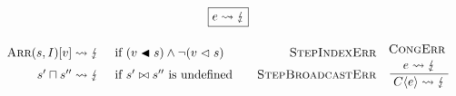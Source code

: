 \renewcommand\arraystretch{1.5}
\begin{gather*}
\boxed{e \sterr} \\[0.5em]
\begin{array}{rlr}
\sarrayval{\vess}{I}[v] 
\leadsto \lightning 
&\text{ if } (v \inbstr \vess) \land \lnot (v \inbs \vess) 
& \textsc{StepIndexErr} \\
\vess' \broadcast \vess'' 
\leadsto \lightning 
&\text{ if } \vess' \broadcastsem \vess'' \text{ is undefined} 
&\quad \textsc{StepBroadcastErr}
\end{array}
\irule{CongErr}{e \leadsto \lightning}{\evalct{C}{e} \leadsto \lightning}
\end{gather*}

